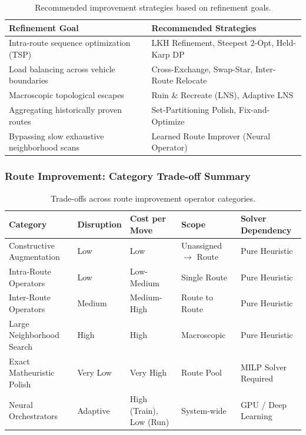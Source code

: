 \documentclass{article}
\begin{document}
\begin{table}[H]
    \centering
    \caption{Recommended improvement strategies based on refinement goals.}
    \begin{tabularx}{\textwidth}{@{} l X @{}}
        \toprule
        \textbf{Refinement Goal} & \textbf{Recommended Strategies} \\
        \midrule
        Intra-route sequence optimization (TSP) & LKH Refinement, Steepest 2-Opt, Held-Karp DP \\
        Load balancing across vehicle boundaries & Cross-Exchange, Swap-Star, Inter-Route Relocate \\
        Macroscopic topological escapes & Ruin \& Recreate (LNS), Adaptive LNS \\
        Aggregating historically proven routes & Set-Partitioning Polish, Fix-and-Optimize \\
        Bypassing slow exhaustive neighborhood scans & Learned Route Improver (Neural Operator) \\
        \bottomrule
    \end{tabularx}
\end{table}

\subsubsection*{Route Improvement: Category Trade-off Summary}

\begin{table}[H]
    \centering
    \caption{Trade-offs across route improvement operator categories.}
    \begin{tabularx}{\textwidth}{@{} X l l l X @{}}
        \toprule
        \textbf{Category} & \textbf{Disruption} & \textbf{Cost per Move} & \textbf{Scope} & \textbf{Solver Dependency} \\
        \midrule
        Constructive Augmentation & Low & Low & Unassigned $\to$ Route & Pure Heuristic \\
        Intra-Route Operators & Low & Low-Medium & Single Route & Pure Heuristic \\
        Inter-Route Operators & Medium & Medium-High & Route to Route & Pure Heuristic \\
        Large Neighborhood Search & High & High & Macroscopic & Pure Heuristic \\
        Exact Matheuristic Polish & Very Low & Very High & Route Pool & MILP Solver Required \\
        Neural Orchestrators & Adaptive & High (Train), Low (Run) & System-wide & GPU / Deep Learning \\
        \bottomrule
    \end{tabularx}
\end{table}
\end{document}
